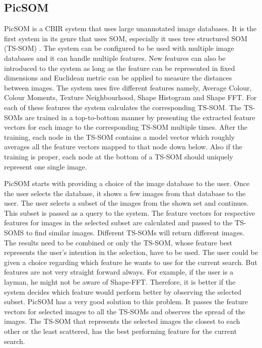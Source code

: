 \documentclass[english]{tktltiki}
\begin{document}
\subsection{PicSOM}

PicSOM is a CBIR system that uses large unannotated image databases. It is the first system in its genre that uses SOM, especially it uses tree structured SOM (TS-SOM) \cite{TSSOM, TSSOM_progress}. The system can be configured to be used with multiple image databases and it can handle multiple features. New features can also be introduced to the system as long as the feature can be represented in fixed dimensions and Euclidean metric can be applied to measure the distances between images. The system uses five different features namely, Average Colour, Colour Moments, Texture Neighbourhood, Shape Histogram and Shape FFT. For each of these features the system calculates the corresponding TS-SOM. The TS-SOMs are trained in a top-to-bottom manner by presenting the extracted feature vectors for each image to the corresponding TS-SOM multiple times. After the training, each node in the TS-SOM contains a model vector which roughly averages all the feature vectors mapped to that node down below. Also if the training is proper, each node at the bottom of a TS-SOM should uniquely represent one single image.

PicSOM starts with providing a choice of the image database to the user. Once the user selects the database, it shows a few images from that database to the user. The user selects a subset of the images from the shown set and continues. This subset is passed as a query to the system. The feature vectors for respective features for images in the selected subset are calculated and passed to the TS-SOMS to find similar images. Different TS-SOMs will return different images. The results need to be combined or only the TS-SOM, whose feature best represents the user's intention in the selection, have to be used. The user could be given a choice regarding which feature he wants to use for the current search. But features are not very straight forward always. For example, if the user is a layman, he might not be aware of Shape-FFT. Therefore, it is better if the system decides which feature would perform better by observing the selected subset. PicSOM has a very good solution to this problem. It passes the feature vectors for selected images to all the TS-SOMs and observes the spread of the images. The TS-SOM that represents the selected images the closest to each other or the least scattered, has the best performing feature for the current search.
\end{document}

